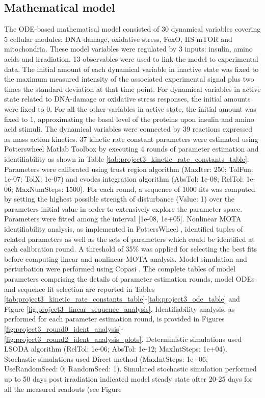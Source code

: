 \subsection{Mathematical model}
\label{project3-subsec:Mathematical model}
The ODE-based mathematical model consisted of 30 dynamical variables covering 5 cellular modules: DNA-damage, oxidative stress, FoxO, IIS-mTOR and mitochondria. These model variables were regulated by 3 inputs: insulin, amino acids and irradiation. 13 observables were used to link the model to experimental data. The initial amount of each dynamical variable in inactive state was fixed to the maximum measured intensity of the associated experimental signal plus two times the standard deviation at that time point. For dynamical variables in active state related to DNA-damage or oxidative stress responses, the initial amounts were fixed to 0. For all the other variables in active state, the initial amount was fixed to 1, approximating the basal level of the proteins upon insulin and amino acid stimuli. The dynamical variables were connected by 39 reactions expressed as mass action kinetics. 37 
kinetic rate constant parameters were estimated using Potterswheel Matlab Toolbox \citep{Maiwald2008} by executing 4 rounds of parameter estimation and identifiability as shown in Table \ref{tab:project3_kinetic_rate_constants_table}. Parameters were calibrated using trust region algorithm (MaxIter: 250; TolFun: 1e-07; TolX: 1e-07) and cvodes integration algorithm (AbsTol: 1e-08; RelTol: 1e-06; MaxNumSteps: 1500). For each round, a sequence of 1000 fits was computed by setting the highest possible strength of disturbance (Value: 1) over the parameters initial value in order to extensively explore the parameter space. Parameters were fitted among the interval [1e-08, 1e+05]. Nonlinear MOTA identifiability analysis, as implemented in PottersWheel \citep{Hengl2007, Maiwald2008}, identified tuples of related parameters as well as the sets of parameters which could be identified at each calibration round. A threshold of 35\% was applied for selecting the best fits before computing linear and nonlinear MOTA 
analysis. Model simulation and perturbation were performed using Copasi \citep{Hoops2006}. The complete tables of model parameters comprising the details of parameter estimation rounds, model ODEs and sequence fit selection are reported in Tables \ref{tab:project3_kinetic_rate_constants_table}-\ref{tab:project3_ode_table} and Figure \ref{fig:project3_linear_sequence_analysis}. Identifiability analysis, as performed for each parameter estimation round, is provided in Figures \ref{fig:project3_round0_ident_analysis}-\ref{fig:project3_round2_ident_analysis_plots}. Deterministic simulations used LSODA algorithm (RelTol: 1e-06; AbsTol: 1e-12; MaxIntSteps: 1e+04). Stochastic simulations used Direct method (MaxIntSteps: 1e+06; UseRandomSeed: 0; RandomSeed: 1). Simulated stochastic simulation performed up to 50 days post irradiation indicated model steady state after 20-25 days for all the measured readouts (see Figure 
